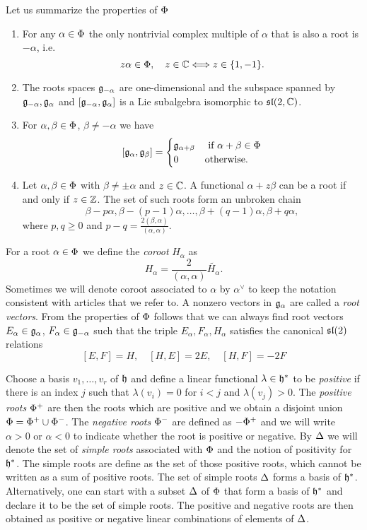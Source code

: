 Let us summarize the properties of $\Phi$
\begin{enumerate}
 \item For any $\alpha \in \Phi$ the only nontrivial complex multiple of $\alpha$ that is also a root is $-\alpha$, i.e.
	\[ z \alpha \in \Phi, \quad z\in \mathbb{C} \Longleftrightarrow z \in \{ 1, -1 \}. \]
 \item The roots spaces $\mathfrak{g}_{-\alpha}$ are one-dimensional and the subspace spanned by $\mathfrak{g}_{-\alpha}, \mathfrak{g}_\alpha$ and $[\mathfrak{g}_{-\alpha}, \mathfrak{g}_\alpha]$ is a Lie subalgebra isomorphic to $\mathfrak{sl}(2,\mathbb{C})$.
 \item For $\alpha, \beta \in \Phi$, $\beta \neq -\alpha$ we have
 \[
  [\mathfrak{g}_\alpha,\mathfrak{g}_\beta] = \begin{cases}
				      \mathfrak{g}_{\alpha + \beta} & \text{ if } \alpha + \beta \in \Phi \\
				        0 & \text{otherwise}.
                                  \end{cases}
 \]
 \item Let $\alpha, \beta \in \Phi$ with $\beta \neq \pm \alpha$ and $z\in\mathbb{C}$. A functional $\alpha + z\beta$ can be a root if and only if $z\in\mathbb{Z}$. The set of such roots form an unbroken chain
 \[ \beta - p\alpha, \beta -(p-1)\alpha, \ldots, \beta + (q-1)\alpha, \beta +q\alpha, \]
       where $p,q\geq 0$ and $p-q = \frac{2(\beta,\alpha)}{(\alpha,\alpha)}$. 
\end{enumerate}

For a root $\alpha \in \Phi$ we define the \emph{coroot} $H_\alpha$ as
\[
 H_\alpha = \frac{2}{(\alpha,\alpha)}\widetilde{H_\alpha}.
\]
Sometimes we will denote coroot associated to $\alpha$ by $\alpha^\vee$ to keep the notation consistent with articles that we refer to. A nonzero vectors in $\mathfrak{g}_\alpha$ are called a \emph{root vectors}. From the properties of $\Phi$ follows that we can always find root vectors $E_\alpha \in \mathfrak{g}_\alpha$, $F_\alpha \in \mathfrak{g}_{-\alpha}$ such that the triple $E_\alpha, F_\alpha, H_\alpha$ satisfies the canonical $\mathfrak{sl}(2)$ relations
\[
 [E,F] = H, \quad [H,E] = 2E, \quad [H,F] = -2F
\]

Choose a basis $v_1, \ldots, v_r$ of $\mathfrak{h}$ and define a linear functional $\lambda\in\mathfrak{h}^*$ to be \emph{positive} if there is an index $j$ such that $\lambda(v_i) = 0$ for $i<j$ and $\lambda(v_j) > 0$. The \emph{positive roots} $\Phi^+$ are then the roots which are positive and we obtain a disjoint union $\Phi = \Phi^+ \cup \Phi^-$. The \emph{negative roots}  $\Phi^-$ are defined as $-\Phi^+$ and we will write $\alpha > 0$ or $\alpha < 0$ to indicate whether the root is positive or negative. By $\Delta$ we will denote the set of \emph{simple roots} associated with $\Phi$ and the notion of positivity for $\mathfrak{h}^*$. The simple roots are define as the set of those positive roots, which cannot be written as a sum of positive roots. The set of simple roots $\Delta$ forms a basis of $\mathfrak{h}^*$. Alternatively, one can start with a subset $\Delta$ of $\Phi$ that form a basis of $\mathfrak{h}^*$ and declare it to be the set of simple roots. The positive and negative roots are then obtained as 
positive or negative linear combinations of elements of $\Delta$.

